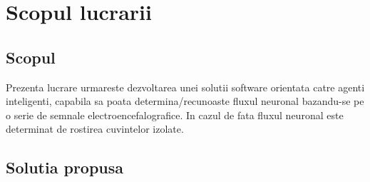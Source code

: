 \section{Scopul lucrarii}

\subsection{Scopul}

\quad Prezenta lucrare urmareste dezvoltarea unei solutii software
orientata catre agenti inteligenti, capabila sa poata
determina/recunoaste fluxul neuronal bazandu-se pe o serie de 
semnale electroencefalografice. In cazul de fata fluxul neuronal este
determinat de rostirea cuvintelor izolate.

\subsection{Solutia propusa}


